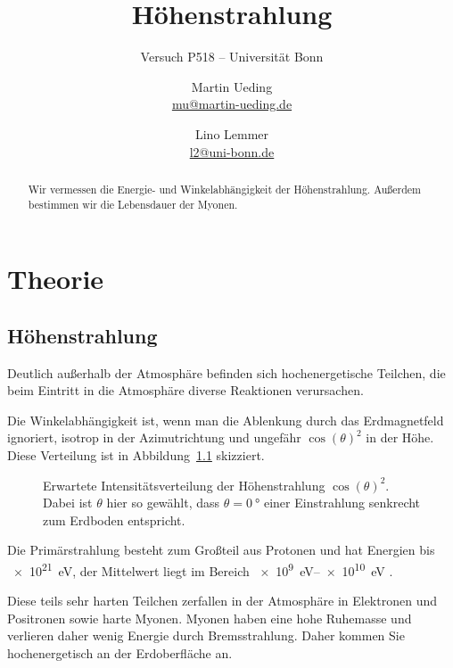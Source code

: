 \documentclass[11pt, ngerman, fleqn, DIV=15, headinclude, BCOR=2cm]{scrreprt}
\title{Höhenstrahlung}
\subtitle{Versuch P518 -- Universität Bonn}
\author{
    Martin Ueding \\ \small{\href{mailto:mu@martin-ueding.de}{mu@martin-ueding.de}}
    \and
    Lino Lemmer \\
    \small{\href{mailto:l2@uni-bonn.de}{l2@uni-bonn.de}}
}
\date{\daterange{2014-07-02}{2014-07-03}}
\begin{document}
\maketitle

\begin{abstract}
    Wir vermessen die Energie- und Winkelabhängigkeit der Höhenstrahlung.
    Außerdem bestimmen wir die Lebensdauer der Myonen.
\end{abstract}

\tableofcontents

\chapter{Theorie}

\section{Höhenstrahlung}

Deutlich außerhalb der Atmosphäre befinden sich hochenergetische Teilchen, die
beim Eintritt in die Atmosphäre diverse Reaktionen verursachen. 

Die Winkelabhängigkeit ist, wenn man die Ablenkung durch das Erdmagnetfeld
ignoriert, isotrop in der Azimutrichtung und ungefähr $\cos(\theta)^2$ in der
Höhe. Diese Verteilung ist in Abbildung~\ref{fig:cos2} skizziert.

\begin{figure}[htbp]
    \centering
    \caption{%
        Erwartete Intensitätsverteilung der Höhenstrahlung $\cos(\theta)^2$.
        Dabei ist $\theta$ hier so gewählt, dass $\theta = \SI{0}{\degree}$
        einer Einstrahlung senkrecht zum Erdboden entspricht.
    }
    \label{fig:cos2}
\end{figure}

Die Primärstrahlung besteht zum Großteil aus Protonen und hat Energien bis
\SI{e21}{\electronvolt}, der Mittelwert liegt im Bereich
\SIrange{e9}{e10}{\electronvolt} \parencite[983]{meschede-gerthsen_24}.

Diese teils sehr harten Teilchen zerfallen in der Atmosphäre in Elektronen und
Positronen sowie harte Myonen. Myonen haben eine hohe Ruhemasse und verlieren
daher wenig Energie durch Bremsstrahlung. Daher kommen Sie hochenergetisch an
der Erdoberfläche an. \parencite[984]{meschede-gerthsen_24}
\end{document}
